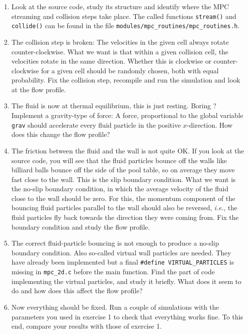 \documentclass[sizes,12pt,nftimes]{article}
\begin{document}
\begin{enumerate}
\item Look at the source code, study its structure and identify where
  the MPC streaming and collision steps take place. The called
  functions \mbox{\texttt{stream()}} and
  \mbox{\texttt{collide()}} can be found in the file
  \mbox{\texttt{modules/mpc\_routines/mpc\_routines.h}}.
\item The collision step is broken: The velocities in the given cell
  always rotate counter-clockwise. What we want is that within a given
  collision cell, the velocities rotate in the same direction. Whether
  this is clockwise or counter-clockwise for a given cell should be
  randomly chosen, both with equal probability. Fix the collision
  step, recompile and run the simulation and look at the flow profile.
\item The fluid is now at thermal equilibrium, this is just
  resting. Boring ? Implement a gravity-type of force: A force,
  proportional to the global variable \mbox{\texttt{grav}} should
  accelerate every fluid particle in the positive $x$-direction. How
  does this change the flow profile?
\item The friction between the fluid and the wall is not quite OK. If
  you look at the source code, you will see that the fluid particles
  bounce off the walls like billiard balls bounce off the side of the
  pool table, so on average they move fast close to the wall. This is
  the slip boundary condition. What we want is the no-slip boundary
  condition, in which the average velocity of the fluid close to the
  wall should be zero. For this, the momentum component of the
  bouncing fluid particles parallel to the wall should also be
  reversed, \emph{i.e.}, the fluid particles fly back towards the
  direction they were coming from. Fix the boundary condition and
  study the flow profile.
\item The correct fluid-particle bouncing is not enough to produce a
  no-slip boundary condition. Also so-called virtual wall particles
  are needed. They have already been implemented but a final
  \mbox{\texttt{\#define VIRTUAL\_PARTICLES}} is missing in
  \mbox{\texttt{mpc\_2d.c}} before the main function. Find the part of
  code implementing the virtual particles, and study it briefly. What
  does it seem to do and how does this affect the flow profile?
\item Now everything should be fixed. Run a couple of simulations with
  the parameters you used in exercise 1 to check that everything works
  fine. To this end, compare your results with those of exercise 1.
\end{enumerate}
\end{document}
